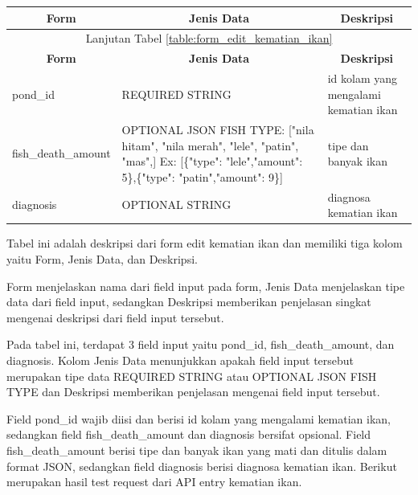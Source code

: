 \begin{enumerate}[1.]
\begin{longtable}{| l | p{5cm} | p{5cm} |}
\hline
\multicolumn{1}{|c|}{\textbf{Form}} & \multicolumn{1}{|c|}{\textbf{Jenis Data}} & \multicolumn{1}{|c|}{\textbf{Deskripsi}}\\
\hline
\endfirsthead

\hline
\multicolumn{3}{|c|}{Lanjutan Tabel \ref{table:form_edit_kematian_ikan}}\\
\hline
\multicolumn{1}{|c|}{\textbf{Form}} & \multicolumn{1}{|c|}{\textbf{Jenis Data}} & \multicolumn{1}{|c|}{\textbf{Deskripsi}}\\
\hline
\endhead

                                          

pond\_id            & REQUIRED STRING                                                                                                                                             & id kolam yang mengalami kematian ikan \\ \hline
fish\_death\_amount & OPTIONAL JSON FISH TYPE: {[}"nila hitam", "nila merah", "lele", "patin", "mas",{]} Ex: {[}\{"type": "lele","amount": 5\},\{"type": "patin","amount": 9\}{]} & tipe dan banyak ikan                  \\ \hline
diagnosis           & OPTIONAL STRING                                                                                                                                             & diagnosa kematian ikan                \\ \hline

\end{longtable}


Tabel ini adalah deskripsi dari form edit kematian ikan dan memiliki tiga kolom yaitu Form, Jenis Data, dan Deskripsi.

Form menjelaskan nama dari field input pada form, Jenis Data menjelaskan tipe data dari field input, sedangkan Deskripsi memberikan penjelasan singkat mengenai deskripsi dari field input tersebut.

Pada tabel ini, terdapat 3 field input yaitu pond\_id, fish\_death\_amount, dan diagnosis. Kolom Jenis Data menunjukkan apakah field input tersebut merupakan tipe data REQUIRED STRING atau OPTIONAL JSON FISH TYPE dan Deskripsi memberikan penjelasan mengenai field input tersebut.

Field pond\_id wajib diisi dan berisi id kolam yang mengalami kematian ikan, sedangkan field fish\_death\_amount dan diagnosis bersifat opsional. Field fish\_death\_amount berisi tipe dan banyak ikan yang mati dan ditulis dalam format JSON, sedangkan field diagnosis berisi diagnosa kematian ikan.
Berikut merupakan hasil test request dari API entry kematian ikan.


\end{enumerate}
